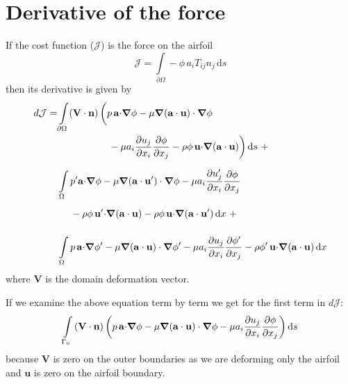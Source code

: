 \documentclass[12pt, a4paper]{article}
\begin{document}
\section{Derivative of the force} \label{app:force}
    If the cost function ($\mathcal{J}$) is the force on the airfoil
    \begin{equation}
        \mathcal{J} = \int\limits_{\partial \Omega} - \phi \, a_i T_{ij} n_j \, \mathrm{d}s
    \end{equation}
    then its derivative is given by
    \begin{equation} \label{cost_change_1}
    \begin{split}
        d \mathcal{J} =& \int\limits_{\partial \Omega}(\mathbf{V \cdot n}) \, \bigg{(} 
            {p\, \mathbf{a \cdot} \boldsymbol{\nabla} \phi} -
            {\mu \boldsymbol{\nabla}(\mathbf{a \cdot u}) \cdot \boldsymbol{\nabla} \phi} \\
        & \phantom{\int\limits_{\partial \Omega}(\mathbf{V \cdot n}) \, \bigg{(} \ } 
            - {\mu a_i \frac{\partial u_j}{\partial x_i} \frac{\partial \phi}{\partial x_j}} - 
            {\rho \phi \, \mathbf{u \cdot} \boldsymbol{\nabla}(\mathbf{a \cdot u})} 
        \bigg{)} \, \mathrm{d}s \ + \\
        &\int\limits_{\Omega} {p' \mathbf{a \cdot} \boldsymbol{\nabla} \phi} - 
            {\mu \boldsymbol{\nabla}(\mathbf{a \cdot u'}) \cdot \boldsymbol{\nabla} \phi} -
            {\mu a_i \frac{\partial u'_j}{\partial x_i} \frac{\partial \phi}{\partial x_j}} \\ 
        & \phantom{\int\limits_{\Omega} \ }
            - {\rho \phi \, \mathbf{u' \cdot} \boldsymbol{\nabla}(\mathbf{a \cdot u})} - 
            {\rho \phi \, \mathbf{u \cdot} \boldsymbol{\nabla}(\mathbf{a \cdot u'})}
        \,  \mathrm{d}x \ + \\
        &\int\limits_{\Omega} p\, \mathbf{a \cdot} \boldsymbol{\nabla} \phi' -
            {\mu \boldsymbol{\nabla}(\mathbf{a \cdot u}) \cdot \boldsymbol{\nabla} \phi'} - 
            {\mu a_i \frac{\partial u_j}{\partial x_i} \frac{\partial \phi'}{\partial x_j}} - 
            {\rho \phi' \, \mathbf{u \cdot} \boldsymbol{\nabla}(\mathbf{a \cdot u})}
        \, \mathrm{d}x
    \end{split}
    \end{equation}
    where $\mathbf{V}$ is the domain deformation vector.
    
    If we examine the above equation term by term we get for the first term in $d \mathcal{J}$:
    \begin{equation} \label{cost_change_term_1}
    \int\limits_{\Gamma_0}{(\mathbf{V \cdot n}) \, \bigg{(} 
        {p\, \mathbf{a \cdot} \boldsymbol{\nabla} \phi} -
        {\mu \boldsymbol{\nabla}(\mathbf{a \cdot u}) \cdot \boldsymbol{\nabla} \phi} - 
        {\mu a_i \frac{\partial u_j}{\partial x_i} \frac{\partial \phi}{\partial x_j}} 
        \bigg{)}} \, \mathrm{d}s
    \end{equation}
    because $\mathbf{V}$ is zero on the outer boundaries as we are deforming only the airfoil and $\mathbf{u}$ is zero on the airfoil boundary.
    
\end{document}
